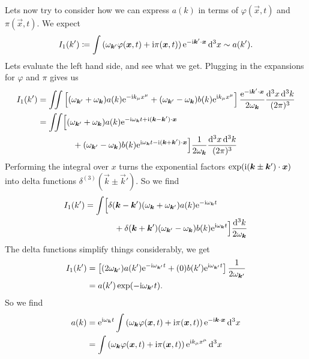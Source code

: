 Lets now try to consider how we can express $a(k)$ in terms of
$\varphi(\vec{x},t)$ and $\pi(\vec{x},t)$. We expect
\begin{equation}
I_{1}(k')\eqDef\int\left(\omega_{\vec{k}'}\varphi(\vec{x},t)+\I\pi(\vec{x},t)\right)\E^{-\I\vec{k}'\cdot\vec{x}}\,\D^{3}x\looksLike a(k').
\end{equation}
Lets evaluate the left hand side, and see what we get. Plugging in the
expansions for $\varphi$ and $\pi$ gives us
\begin{equation}
\begin{split}
I_{1}(k')&=\iint\left[
(\omega_{\vec{k}'}+\omega_{\vec{k}})a(k)\E^{-\I k_{\mu}x^{\mu}}
+(\omega_{\vec{k}'}-\omega_{\vec{k}})b(k)\E^{\I k_{\mu}x^{\mu}}
\right]\frac{\E^{-\I\vec{k}'\cdot\vec{x}}}{2\omega_{\vec{k}}}\frac{\D^{3}x\,\D^{3}k}{(2\pi)^{3}}\\
&=\iint\Bigl[
(\omega_{\vec{k}'}+\omega_{\vec{k}})a(k)\E^{-\I \omega_{\vec{k}}t +\I(\vec{k}-\vec{k}')\cdot\vec{x}}\\
&\phantom{=\iint\Bigl[}\quad+(\omega_{\vec{k}'}-\omega_{\vec{k}})b(k)\E^{\I \omega_{\vec{k}}t - \I(\vec{k}+\vec{k}')\cdot\vec{x}}
\Bigr]\frac{1}{2\omega_{\vec{k}}}\frac{\D^{3}x\,\D^{3}k}{(2\pi)^{3}}
\end{split}
\end{equation}
Performing the integral over $x$ turns the exponential factors
$\exp(\I(\vec{k}\pm\vec{k}')\cdot\vec{x})$ into delta functions
$\delta^{(3)}(\vec{k}\pm\vec{k}')$. So we find
\begin{equation}
\begin{split}
I_{1}(k')&=\int\Bigl[
\delta(\vec{k}-\vec{k}')(\omega_{\vec{k}}+\omega_{\vec{k}'})a(k)\E^{-\I\omega_{\vec{k}}t}\\
&\phantom{=\int\Bigl[}\quad+\delta(\vec{k}+\vec{k}')(\omega_{\vec{k}'}-\omega_{\vec{k}})b(k)\E^{\I \omega_{\vec{k}}t}
\Bigr]\frac{\D^{3}k}{2\omega_{\vec{k}}}
\end{split}
\end{equation}
The delta functions simplify things considerably, we get
\begin{equation}
\begin{split}
I_{1}(k')&=\left[
(2\omega_{\vec{k}'})a(k')\E^{-\I\omega_{\vec{k}'}t}
+(0)b(k')\E^{\I \omega_{\vec{k}'}t}
\right]\frac{1}{2\omega_{\vec{k}'}}\\
&=a(k')\exp(-\I\omega_{\vec{k}'}t).
\end{split}
\end{equation}
So we find
\begin{equation}\label{eq:scalar:ladder-operator-in-terms-of-field-vars}
\begin{split}
a(k) &= \E^{\I\omega_{\vec{k}}t}\int\left(\omega_{\vec{k}}\varphi(\vec{x},t)+\I\pi(\vec{x},t)\right)\E^{-\I\vec{k}\cdot\vec{x}}\,\D^{3}x\\
&=\int\left(\omega_{\vec{k}}\varphi(\vec{x},t)+\I\pi(\vec{x},t)\right)\E^{\I k_{\mu}x^{\mu}}\,\D^{3}x
\end{split}
\end{equation}

